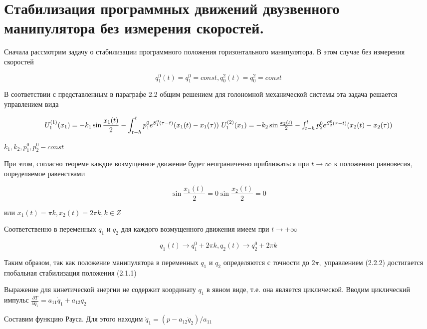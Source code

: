 \section{Стабилизация программных движений двузвенного манипулятора без измерения скоростей.} \label{p15}

Сначала рассмотрим задачу о стабилизации программного положения горизонтального манипулятора. В этом случае без измерения скоростей 

\begin{equation}
q^0_1 (t) = q^0_1 = const, q^2_0 (t) = q^2_0 = const
\end{equation}

В соответствии с представленным в параграфе 2.2 общим решением для голономной механической системы эта задача решается управлением вида 

\begin{equation}
U^{(1)}_1 (x_1) = - k_1 \sin \frac{x_1(t)}{2} - \int_{t-h}^t p_1^0 e^{S_1^0 (\tau - t)} (x_1 (t) - x_1 (\tau))$ $U^{(2)}_1 (x_1) = - k_2 \sin \frac{x_2(t)}{2} - \int_{t-h}^t p_2^0 e^{S_2^0 (\tau - t)} (x_2 (t) - x_2 (\tau))
\end{equation}

$k_1, k_2, p_1^0, p_2^0 - const$

При этом, согласно теореме каждое возмущенное движение будет неограниченно приближаться при $t \to \infty$ к положению равновесия, определяемое равенствами 

$$\sin \frac{x_1(t)}{2} = 0 \sin \frac{x_2(t)}{2} = 0$$
		
или $x_1(t) = \pi k, x_2(t) = 2 \pi k, k \in Z$
		
Соответственно в переменных $q_1$ и $q_2$ для каждого возмущенного движения имеем при $t \to +\infty$ 

\begin{equation}
q_1 (t) \to q_1^0 + 2 \pi k, q_2(t) \to q_2^0 + 2 \pi k
\end{equation}

		
Таким образом, так как положение манипулятора в переменных $q_1$ и $q_2$ определяются с точности до $2 \pi,$ управлением (2.2.2) достигается глобальная стабилизация положения (2.1.1)
		
Выражение для кинетической энергии не содержит координату $q_1$ в явном виде, т.е. она является циклической. Вводим циклический импульс $\frac{\partial T}{\partial \dot q_1} = a_{11} \dot q_1 + a_{12} \dot q_2$
		
Составим функцию Рауса. Для этого находим $\dot q_1 = (p - a_12 \dot q_2) / a_{11}$
		
